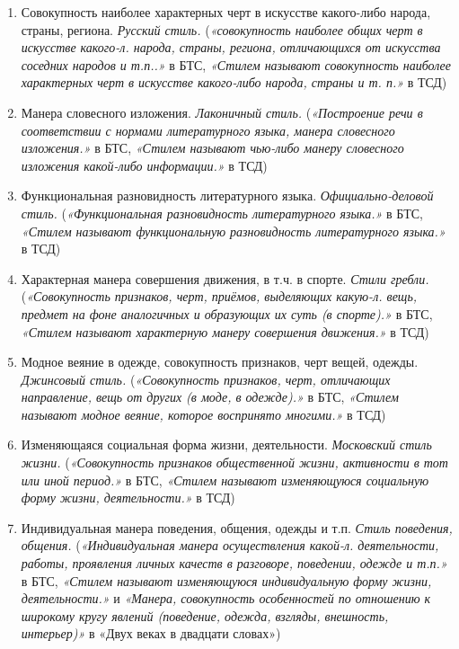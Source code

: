 \begin{enumerate}
    \item Совокупность наиболее характерных черт в искусстве какого-либо народа, страны, региона. \textit{Русский стиль.}
(\textit{«совокупность наиболее общих черт в искусстве какого-л. народа, страны, региона, отличающихся от искусства соседних народов и т.п..»} в БТС,
\textit{«Стилем называют совокупность наиболее характерных черт в искусстве какого-либо народа, страны и т. п.»} в ТСД)

    \item Манера словесного изложения. \textit{Лаконичный стиль.}
(\textit{«Построение речи в соответствии с нормами литературного языка, манера словесного изложения.»} в БТС,
\textit{«Стилем называют чью-либо манеру словесного изложения какой-либо информации.»} в ТСД)

    \item Функциональная разновидность литературного языка. \textit{Официально-деловой стиль.}
(\textit{«Функциональная разновидность литературного языка.»} в БТС,
\textit{«Стилем называют функциональную разновидность литературного языка.»} в ТСД)

    \item Характерная манера совершения движения, в т.ч. в спорте. \textit{Стили гребли.}
(\textit{«Совокупность признаков, черт, приёмов, выделяющих какую-л. вещь, предмет на фоне аналогичных и образующих их суть (в спорте).»} в БТС,
\textit{«Стилем называют характерную манеру совершения движения.»} в ТСД)

    \item Модное веяние в одежде, совокупность признаков, черт вещей, одежды. \textit{Джинсовый стиль.}
(\textit{«Совокупность признаков, черт, отличающих направление, вещь от других (в моде, в одежде).»} в БТС,
\textit{«Стилем называют модное веяние, которое воспринято многими.»} в ТСД)

    \item Изменяющаяся социальная форма жизни, деятельности. \textit{Московский стиль жизни.}
(\textit{«Совокупность признаков общественной жизни, активности в тот или иной период.»} в БТС,
\textit{«Стилем называют изменяющуюся социальную форму жизни, деятельности.»} в ТСД)

    \item Индивидуальная манера поведения, общения, одежды и т.п. \textit{Стиль поведения, общения.}
(\textit{«Индивидуальная манера осуществления какой-л. деятельности, работы, проявления личных качеств в разговоре, поведении, одежде и т.п.»} в БТС,
\textit{«Стилем называют изменяющуюся индивидуальную форму жизни, деятельности.»} и \textit{«Манера, совокупность особенностей по отношению к широкому кругу явлений (поведение, одежда, взгляды, внешность, интерьер)»} в «Двух веках в двадцати словах»)


\end{enumerate}


